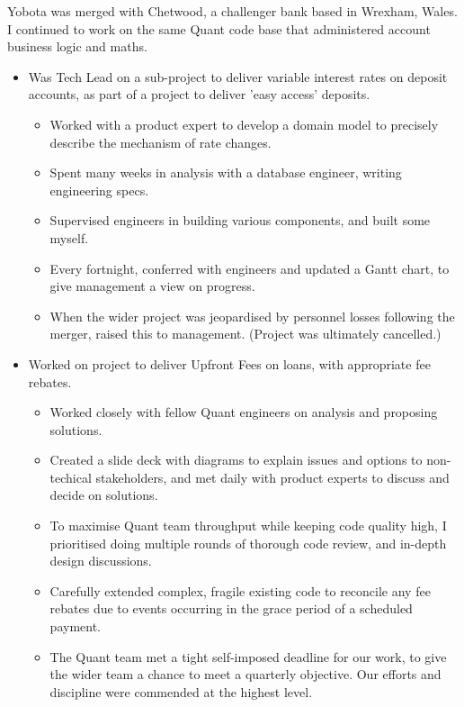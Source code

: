 \documentclass[11pt,a4paper,sans]{moderncv} %
\begin{document}
{Yobota was merged with Chetwood, a challenger bank based in Wrexham, Wales.  I continued to work on the same Quant code base that administered account business logic and maths.
\begin{itemize}
    \item Was Tech Lead on a sub-project to deliver variable interest rates on deposit accounts, as part of a project to deliver 'easy access' deposits.
        \begin{itemize}
            \item Worked with a product expert to develop a domain model to precisely describe the mechanism of rate changes.
            \item Spent many weeks in analysis with a database engineer, writing engineering specs.
            \item Supervised engineers in building various components, and built some myself.
            \item Every fortnight, conferred with engineers and updated a Gantt chart, to give management a view on progress.
            \item When the wider project was jeopardised by personnel losses following the merger, raised this to management.  (Project was ultimately cancelled.)
        \end{itemize}
    \item Worked on project to deliver Upfront Fees on loans, with appropriate fee rebates.
        \begin{itemize}
            \item Worked closely with fellow Quant engineers on analysis and proposing solutions.
            \item Created a slide deck with diagrams to explain issues and options to non-techical stakeholders, and met daily with product experts to discuss and decide on solutions.
            \item To maximise Quant team throughput while keeping code quality high, I prioritised doing multiple rounds of thorough code review, and in-depth design discussions.
            \item Carefully extended complex, fragile existing code to reconcile any fee rebates due to events occurring in the grace period of a scheduled payment.
            \item The Quant team met a tight self-imposed deadline for our work, to give the wider team a chance to meet a quarterly objective.  Our efforts and discipline were commended at the highest level.
        \end{itemize}
\end{itemize}
}
\end{document}
